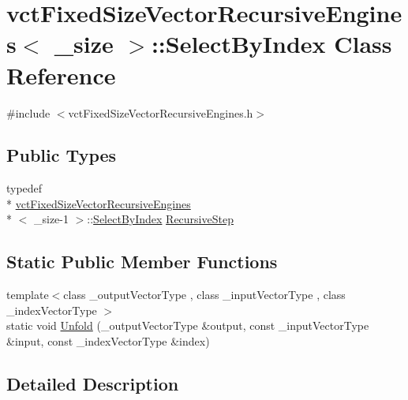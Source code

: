 \hypertarget{classvct_fixed_size_vector_recursive_engines_1_1_select_by_index}{\section{vct\-Fixed\-Size\-Vector\-Recursive\-Engines$<$ \-\_\-size $>$\-:\-:Select\-By\-Index Class Reference}
\label{classvct_fixed_size_vector_recursive_engines_1_1_select_by_index}
}


{\ttfamily \#include $<$vct\-Fixed\-Size\-Vector\-Recursive\-Engines.\-h$>$}

\subsection*{Public Types}
\begin{DoxyCompactItemize}
\item 
typedef \\*
\hyperlink{classvct_fixed_size_vector_recursive_engines}{vct\-Fixed\-Size\-Vector\-Recursive\-Engines}\\*
$<$ \-\_\-size-\/1 $>$\-::\hyperlink{classvct_fixed_size_vector_recursive_engines_1_1_select_by_index}{Select\-By\-Index} \hyperlink{classvct_fixed_size_vector_recursive_engines_1_1_select_by_index_a1a6c0ae1c4db3cad550f893bf47e665d}{Recursive\-Step}
\end{DoxyCompactItemize}
\subsection*{Static Public Member Functions}
\begin{DoxyCompactItemize}
\item 
{\footnotesize template$<$class \-\_\-output\-Vector\-Type , class \-\_\-input\-Vector\-Type , class \-\_\-index\-Vector\-Type $>$ }\\static void \hyperlink{classvct_fixed_size_vector_recursive_engines_1_1_select_by_index_a498a40173f3e88a9599175fa2bd30dff}{Unfold} (\-\_\-output\-Vector\-Type \&output, const \-\_\-input\-Vector\-Type \&input, const \-\_\-index\-Vector\-Type \&index)
\end{DoxyCompactItemize}


\subsection{Detailed Description}
